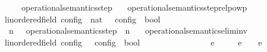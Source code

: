 \begin{isabellebody}
\isanewline
\ \ {\isacartoucheopen}{\isasymC}\ {\isasymhookrightarrow}\isactrlsup {\isacharequal}\isactrlsup {\isacharequal}\ {\isasymC}\ {\isasymequiv}\ operational{\isacharunderscore}semantics{\isacharunderscore}step\isactrlsup {\isacharequal}\isactrlsup {\isacharequal}\ {\isasymC}\ {\isasymC}\isanewline
\isanewline
{}\isamarkupfalse%
\ operational{\isacharunderscore}semantics{\isacharunderscore}step{\isacharunderscore}relpowp\isanewline
\ \ {\isacharcolon}{\isacharcolon}{\isacartoucheopen}{\isacharparenleft}{\isacharprime}{\isasymtau}{\isacharcolon}{\isacharcolon}linordered{\isacharunderscore}field{\isacharparenright}\ config\ {\isasymRightarrow}\ nat\ {\isasymRightarrow}\ {\isacharprime}{\isasymtau}\ config\ {\isasymRightarrow}\ bool{\isacartoucheclose}\ \ \ \ \ \ \ \ \ {\isacharparenleft}{\isachardoublequoteopen}{\isacharunderscore}\ {\isasymhookrightarrow}\isactrlbsup {\isacharunderscore}\isactrlesup \ {\isacharunderscore}{\isachardoublequoteclose}\ {}{}{\isacharparenright}\isanewline
{}\isanewline
\ \ {\isacartoucheopen}{\isasymC}\ {\isasymhookrightarrow}\isactrlbsup n\isactrlesup \ {\isasymC}\ {\isasymequiv}\ {\isacharparenleft}operational{\isacharunderscore}semantics{\isacharunderscore}step\ {\isacharcircum}{\isacharcircum}\ n{\isacharparenright}\ {\isasymC}\ {\isasymC}\isanewline
\isanewline
{}\isamarkupfalse%
\ operational{\isacharunderscore}semantics{\isacharunderscore}elim{\isacharunderscore}inv\isanewline
\ \ {\isacharcolon}{\isacharcolon}{\isacartoucheopen}{\isacharparenleft}{\isacharprime}{\isasymtau}{\isacharcolon}{\isacharcolon}linordered{\isacharunderscore}field{\isacharparenright}\ config\ {\isasymRightarrow}\ {\isacharprime}{\isasymtau}\ config\ {\isasymRightarrow}\ bool{\isacartoucheclose}\ \ \ \ \ \ \ \ \ \ \ \ \ \ \ \ {\isacharparenleft}{\isachardoublequoteopen}{\isacharunderscore}\ {\isasymhookrightarrow}\isactrlsub e\isactrlsup {\isasymleftarrow}\ {\isacharunderscore}{\isachardoublequoteclose}\ {}{}{\isacharparenright}\isanewline
{}\isanewline
\ \ {\isacartoucheopen}{\isasymC}\ {\isasymhookrightarrow}\isactrlsub e\isactrlsup {\isasymleftarrow}\ {\isasymC}\ {\isasymequiv}\ {\isasymC}\ {\isasymhookrightarrow}\isactrlsub e\ {\isasymC}%

\end{isabellebody}
